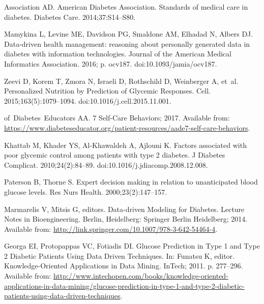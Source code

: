 \documentclass[10pt,letterpaper]{article}
\begin{document}

\nolinenumbers

% 
% 

\begin{thebibliography}{10}

Association AD.
\newblock American Diabetes Association. Standards of medical care in diabetes.
\newblock Diabetes Care. 2014;37:S14--S80.

Mamykina L, Levine ME, Davidson PG, Smaldone AM, Elhadad N, Albers DJ.
\newblock Data-driven health management: reasoning about personally generated
  data in diabetes with information technologies.
\newblock Journal of the American Medical Informatics Association. 2016; p.
  ocv187.
\newblock doi:{10.1093/jamia/ocv187}.

Zeevi D, Korem T, Zmora N, Israeli D, Rothschild D, Weinberger A, et~al.
\newblock Personalized {Nutrition} by {Prediction} of {Glycemic} {Responses}.
\newblock Cell. 2015;163(5):1079--1094.
\newblock doi:{10.1016/j.cell.2015.11.001}.

of~Diabetes~Educators AA. 7 {Self}-{Care} {Behaviors}; 2017.
\newblock Available from:
  \url{https://www.diabeteseducator.org/patient-resources/aade7-self-care-behaviors}.

Khattab M, Khader YS, Al-Khawaldeh A, Ajlouni K.
\newblock Factors associated with poor glycemic control among patients with
  type 2 diabetes.
\newblock J Diabetes Complicat. 2010;24(2):84--89.
\newblock doi:{10.1016/j.jdiacomp.2008.12.008}.

Paterson B, Thorne S.
\newblock Expert decision making in relation to unanticipated blood glucose
  levels.
\newblock Res Nurs Health. 2000;23(2):147--157.

Marmarelis V, Mitsis G, editors.
\newblock Data-driven {Modeling} for {Diabetes}.
\newblock Lecture {Notes} in {Bioengineering}. Berlin, Heidelberg: Springer
  Berlin Heidelberg; 2014.
\newblock Available from:
  \url{http://link.springer.com/10.1007/978-3-642-54464-4}.

Georga EI, Protopappas VC, Fotiadis DI.
\newblock Glucose {Prediction} in {Type} 1 and {Type} 2 {Diabetic} {Patients}
  {Using} {Data} {Driven} {Techniques}.
\newblock In: Funatsu K, editor. Knowledge-{Oriented} {Applications} in {Data}
  {Mining}. InTech; 2011. p. 277--296.
\newblock Available from:
  \url{http://www.intechopen.com/books/knowledge-oriented-applications-in-data-mining/glucose-prediction-in-type-1-and-type-2-diabetic-patients-using-data-driven-techniques}.


\end{thebibliography}
\end{document}
